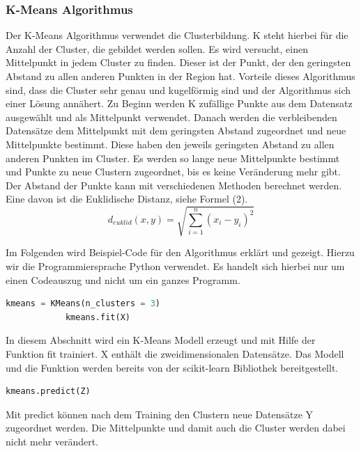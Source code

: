 	 	\subsubsection{K-Means Algorithmus}
	 	Der K-Means Algorithmus verwendet die Clusterbildung. K steht hierbei für die Anzahl der Cluster, die gebildet werden sollen. \cite{Kirk2014} Es wird versucht, einen Mittelpunkt in jedem Cluster zu finden. Dieser ist der Punkt, der den geringsten Abstand zu allen anderen Punkten in der Region hat. \cite{Mueller2016} Vorteile dieses Algorithmus sind, dass die Cluster sehr genau und kugelförmig sind und der Algorithmus sich einer Lösung annähert. \cite{Kirk2014} \newline
	 	Zu Beginn werden K zufällige Punkte aus dem Datensatz ausgewählt und als Mittelpunkt verwendet. \cite{Kirk2014} Danach werden die verbleibenden Datensätze dem Mittelpunkt mit dem geringsten Abstand zugeordnet und neue Mittelpunkte bestimmt. Diese haben den jeweils geringsten Abstand zu allen anderen Punkten im Cluster. Es werden so lange neue Mittelpunkte bestimmt und Punkte zu neue Clustern zugeordnet, bis es keine Veränderung mehr gibt. \cite{Mueller2016} Der Abstand der Punkte kann mit verschiedenen Methoden berechnet werden. Eine davon ist die Euklidische Distanz, siehe Formel (2). \cite{Kirk2014}
	 	\begin{equation}
	 	d_{euklid}(x,y)= \sqrt{\sum_{i=1}^{n}(x_i - y_i)^2}
	 	\end{equation}
	 	
	 	Im Folgenden wird Beispiel-Code für den Algorithmus erklärt und gezeigt. Hierzu wir die Programmiersprache Python verwendet. Es handelt sich hierbei nur um einen Codeauszug und nicht um ein ganzes Programm.
	 	
	 	\begin{lstlisting}[language=Python]
	 		kmeans = KMeans(n_clusters = 3)
	 		kmeans.fit(X)
	 	\end{lstlisting}
	 	In diesem Abschnitt wird ein K-Means Modell erzeugt und mit Hilfe der Funktion fit trainiert. X enthält die zweidimensionalen Datensätze. Das Modell und die Funktion werden bereits von der scikit-learn Bibliothek bereitgestellt.
	 		\begin{lstlisting}[language=Python]
	 		kmeans.predict(Z)
	 		\end{lstlisting}
	 	Mit predict können nach dem Training den Clustern neue Datensätze Y zugeordnet werden. Die Mittelpunkte und damit auch die Cluster werden dabei nicht mehr verändert. \cite{Mueller2016}
	 	
